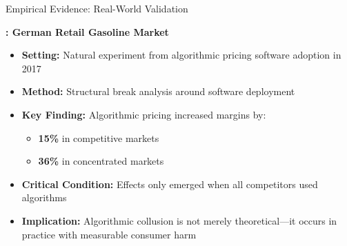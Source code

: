 \documentclass[10pt, aspectratio=169]{beamer}
\begin{document}
\begin{frame}{Empirical Evidence: Real-World Validation}
    \begin{center}
    \begin{block}{\textbf{\textcite{assad_algorithmic_2024}: German Retail Gasoline Market}}
    \begin{itemize}
        \item \textbf{Setting:} Natural experiment from algorithmic pricing software adoption in 2017
        \item \textbf{Method:} Structural break analysis around software deployment
        \item \textbf{Key Finding:} Algorithmic pricing increased margins by:
        \begin{itemize}
            \item \textbf{15\%} in competitive markets
            \item \textbf{36\%} in concentrated markets
        \end{itemize}
        \item \textbf{Critical Condition:} Effects only emerged when all competitors used algorithms
        \item \textbf{Implication:} Algorithmic collusion is not merely theoretical---it occurs in practice with measurable consumer harm
    \end{itemize}
    \end{block}
    \end{center}
\end{frame}
\end{document}
